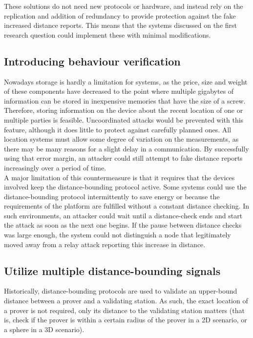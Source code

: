 \documentclass{article}
\begin{document}
These solutions do not need new protocols or hardware, and instead rely on the replication and addition of redundancy to provide protection against the fake increased distance reports. This means that the systems discussed on the first research question could implement these with minimal modifications.\\

\subsection{Introducing behaviour verification}

Nowadays storage is hardly a limitation for systems, as the price, size and weight of these components have decreased to the point where multiple gigabytes of information can be stored in inexpensive memories that have the size of a screw.\\

Therefore, storing information on the device about the recent location of one or multiple parties is feasible. Uncoordinated attacks would be prevented with this feature, although it does little to protect against carefully planned ones. All location systems must allow some degree of variation on the measurements, as there may be many reasons for a slight delay in a communication. By successfully using that error margin, an attacker could still attempt to fake distance reports increasingly over a period of time.\\

A major limitation of this countermeasure is that it requires that the devices involved keep the distance-bounding protocol active. Some systems could use the distance-bounding protocol intermittently to save energy or because the requirements of the platform are fulfilled without a constant distance checking. In such environments, an attacker could wait until a distance-check ends and start the attack as soon as the next one begins. If the pause between distance checks was large enough, the system could not distinguish a node that legitimately moved away from a relay attack reporting this increase in distance.\\



\subsection{Utilize multiple distance-bounding signals}

Historically, distance-bounding protocols are used to validate an upper-bound distance between a prover and a validating station. As such, the exact location of a prover is not required, only its distance to the validating station matters (that is, check if the prover is within a certain radius of the prover in a 2D scenario, or a sphere in a 3D scenario).\\
\end{document}
